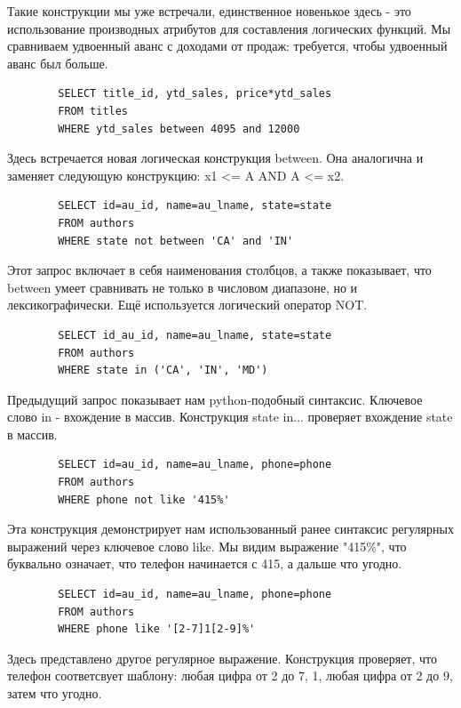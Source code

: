 Такие конструкции мы уже встречали, единственное новенькое здесь - это использование производных атрибутов для составления логических функций. Мы сравниваем удвоенный аванс с доходами от продаж: требуется, чтобы удвоенный аванс был больше. 

\begin{verbatim}
        SELECT title_id, ytd_sales, price*ytd_sales
        FROM titles
        WHERE ytd_sales between 4095 and 12000
\end{verbatim}

Здесь встречается новая логическая конструкция between. Она аналогична и заменяет следующую конструкцию: x1 <= A AND A <= x2. 

\begin{verbatim}
        SELECT id=au_id, name=au_lname, state=state
        FROM authors
        WHERE state not between 'CA' and 'IN'
\end{verbatim}

Этот запрос включает в себя наименования столбцов, а также показывает, что between умеет сравнивать не только в числовом диапазоне, но и лексикографически. Ещё используется логический оператор NOT.

\begin{verbatim}
        SELECT id_au_id, name=au_lname, state=state
        FROM authors
        WHERE state in ('CA', 'IN', 'MD')
\end{verbatim}

Предыдущий запрос показывает нам python-подобный синтаксис. Ключевое слово in - вхождение в массив. Конструкция state in... проверяет вхождение state в массив.

\begin{verbatim}
        SELECT id=au_id, name=au_lname, phone=phone
        FROM authors
        WHERE phone not like '415%'
\end{verbatim}

Эта конструкция демонстрирует нам использованный ранее синтаксис регулярных выражений через ключевое слово like. Мы видим выражение "415\%", что буквально означает, что телефон начинается с 415, а дальше что угодно.  

\begin{verbatim}
        SELECT id=au_id, name=au_lname, phone=phone
        FROM authors
        WHERE phone like '[2-7]1[2-9]%'
\end{verbatim}

Здесь представлено другое регулярное выражение. Конструкция проверяет, что телефон соответсвует шаблону: любая цифра от 2 до 7, 1, любая цифра от 2 до 9, затем что угодно. 

